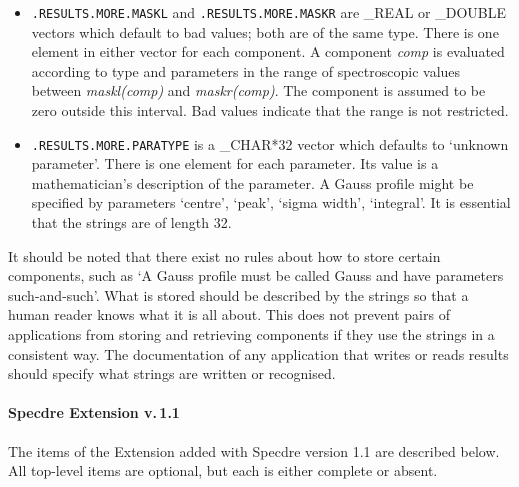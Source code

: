 \begin{itemize}
\item{\tt .RESULTS.MORE.MASKL} and {\tt .RESULTS.MORE.MASKR} are \_REAL
   or \_DOUBLE vectors which default to bad values; both are of the same
   type. There is one element in either vector for each component. A
   component {\it comp} is evaluated according to type and parameters in
   the range of spectroscopic values between {\it maskl(comp)} and {\it
   maskr(comp)}. The component is assumed to be zero outside this
   interval. Bad values indicate that the range is not restricted.

\item{\tt .RESULTS.MORE.PARATYPE} is a \_CHAR*32 vector which defaults
   to `unknown parameter'.  There is one element for each parameter.
   Its value is a mathematician's description of the parameter. A Gauss
   profile might be specified by parameters `centre', `peak', `sigma
   width', `integral'. It is essential that the strings are of length 32.
\end{itemize}

   It should be noted that there exist no rules about how to store
   certain components, such as `A Gauss profile must be called Gauss and
   have parameters such-and-such'. What is stored should be described
   by the strings so that a human reader knows what it is all about.
   This does not prevent pairs of applications from storing and
   retrieving components if they use the strings in a consistent
   way. The documentation of any application that writes or reads
   results should specify what strings are written or recognised.


\paragraph{Specdre Extension v.\,1.1}

   The items of the Extension added with Specdre version 1.1 are
   described below. All top-level items are optional, but each is either
   complete or absent.

